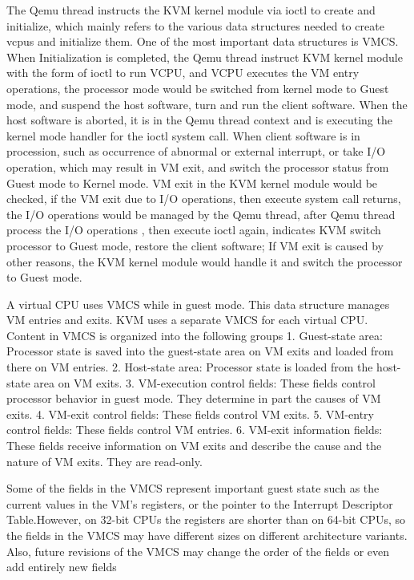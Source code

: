 \documentclass[10pt,draftclsnofoot,peerreview,letterpaper,onecolumn,]{IEEEtran}
\begin{document}
The Qemu thread instructs the KVM kernel module via ioctl to create and initialize, which mainly refers to the various data structures needed to create vcpus and initialize them. One of the most important data structures is VMCS. When Initialization is completed, the Qemu thread instruct KVM kernel module with the form of ioctl to run VCPU, and VCPU executes the VM entry operations, the processor mode would be switched from kernel mode to Guest mode, and suspend the host software, turn and run the client software. When the host software is aborted, it is in the Qemu thread context and is executing the kernel mode handler for the ioctl system call. When client software is in procession, such as occurrence of abnormal or external interrupt, or take  I/O operation, which may result in VM exit, and switch the processor status from Guest mode to Kernel mode. VM exit in the KVM kernel module would be checked, if the VM exit due to I/O operations, then execute system call returns, the I/O operations would be managed by the Qemu thread, after Qemu thread process the I/O operations , then execute ioctl again, indicates  KVM switch processor to Guest mode, restore the client software; If VM exit is caused by other reasons, the KVM kernel module would handle it and switch the processor to Guest mode.

A virtual CPU uses VMCS while in guest mode. This data structure manages VM entries and exits. KVM uses a separate VMCS for each virtual CPU. Content in VMCS is organized into the following groups
1. Guest-state area: Processor state is saved into the guest-state area on VM exits and loaded from there on VM entries.
2. Host-state area: Processor state is loaded from the host-state area on VM exits.
3. VM-execution control fields: These fields control processor behavior in guest mode. They determine in part the causes of VM exits.
4. VM-exit control fields: These fields control VM exits.
5. VM-entry control fields: These fields control VM entries.
6. VM-exit information fields: These fields receive information on VM exits and describe the cause and the nature of VM exits. They are read-only.

Some of the fields in the VMCS represent important guest state such as the current values in the VM’s registers, or the pointer to the Interrupt Descriptor Table.However, on 32-bit CPUs the registers are shorter than on 64-bit CPUs, so the fields in the VMCS may have different sizes on different architecture variants. Also, future revisions of the VMCS may change the order of the fields or even add entirely new fields 
\end{document}
